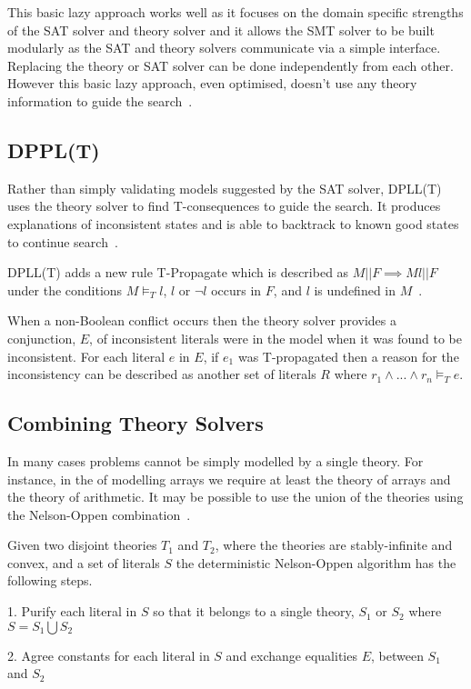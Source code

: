 \documentclass[]{final_report}
\begin{document}
This basic lazy approach works well as it focuses on the domain specific strengths of the SAT solver and theory solver and it allows the SMT solver to be built modularly as the SAT and theory solvers communicate via a simple interface. Replacing the theory or SAT solver can be done independently from each other. However this basic lazy approach, even optimised, doesn't use any theory information to guide the search~\cite{sattosmt}.

\subsection{DPPL(T)}
Rather than simply validating models suggested by the SAT solver, DPLL(T) uses the theory solver to find T-consequences to guide the search. It produces explanations of inconsistent states and is able to backtrack to known good states to continue search~\cite{smtdpplt, ganzinger2004dpll}.

DPLL(T) adds a new rule T-Propagate which is described as $M || F \implies M l || F $ under the conditions $M \models _T l$, $l$ or $\lnot l$ occurs in $F$, and $l$ is undefined in $M$~\cite{sattosmt}.

When a non-Boolean conflict occurs then the theory solver provides a conjunction, $E$, of inconsistent literals were in the model when it was found to be inconsistent. For each literal $e $ in $E$, if $e_1$ was T-propagated then a reason for the inconsistency can be described as another set of literals $R$ where $r_1 \land ... \land r_n \models _T e$. 

\subsection{Combining Theory Solvers}
In many cases problems cannot be simply modelled by a single theory. For instance, in the of modelling arrays we require at least the theory of arrays and the theory of arithmetic. It may be possible to use the union of the theories using the Nelson-Oppen combination~\cite{smtdpplt}.

Given two disjoint theories $T_1$ and $T_2$, where the theories are stably-infinite and convex, and a set of literals $S$ the deterministic Nelson-Oppen algorithm has the following steps.

1. Purify each literal in $S$ so that it belongs to a single theory, $S_1$ or $S_2$ where $S = S_1 \bigcup S_2$

2. Agree constants for each literal in $S$ and exchange equalities $E$, between $S_1$ and $S_2$
\end{document}
